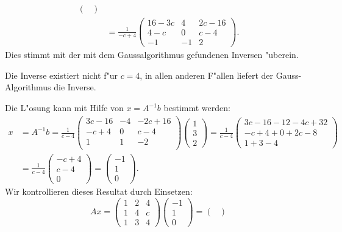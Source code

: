 \begin{loesung}
\begin{teilaufgaben}
\begin{align*}
\begin{pmatrix}
\end{pmatrix}
\\
&=
\frac1{-c+4}
\begin{pmatrix}
   16-3c&      4&  2c-16\\
     4-c&      0&    c-4\\
      -1&     -1&      2
\end{pmatrix}.
\end{align*}
Dies stimmt mit der mit dem Gaussalgorithmus gefundenen Inversen "uberein.
\item
Die Inverse existiert nicht f"ur $c=4$, in allen anderen F"allen
liefert der Gauss-Algorithmus die Inverse.
\item
Die L"osung kann mit Hilfe von $x=A^{-1}b$ bestimmt werden:
\begin{align*}
x&=
A^{-1}b=
\frac{1}{c-4}
\begin{pmatrix}
3c-16&-4& -2c+16\\
-c+ 4& 0&   c- 4\\
    1& 1&    - 2\\
\end{pmatrix}
\begin{pmatrix}1\\3\\2\end{pmatrix}
=
\frac{1}{c-4}
\begin{pmatrix}
3c-16-12-4c+32\\
-c+4+0+2c-8\\
1+3-4
\end{pmatrix}
\\
&=
\frac{1}{c-4}
\begin{pmatrix}
-c+4\\
c-4\\
0
\end{pmatrix}
=\begin{pmatrix}
-1\\1\\0
\end{pmatrix}.
\end{align*}
Wir kontrollieren dieses Resultat durch Einsetzen:
\[
Ax=
\begin{pmatrix}
1&2&4\\
1&4&c\\
1&3&4
\end{pmatrix}
\begin{pmatrix}
-1\\1\\0
\end{pmatrix}
=
\begin{pmatrix}

\end{pmatrix}\]
\end{teilaufgaben}
\end{loesung}
